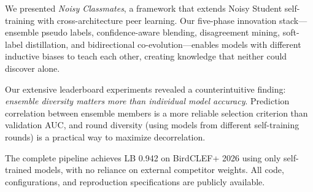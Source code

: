 \documentclass[a4paper]{article}
\begin{document}
We presented \emph{Noisy Classmates}, a framework that extends Noisy Student self-training with cross-architecture peer learning.
Our five-phase innovation stack---ensemble pseudo labels, confidence-aware blending, disagreement mining, soft-label distillation, and bidirectional co-evolution---enables models with different inductive biases to teach each other, creating knowledge that neither could discover alone.

Our extensive leaderboard experiments revealed a counterintuitive finding: \emph{ensemble diversity matters more than individual model accuracy}.
Prediction correlation between ensemble members is a more reliable selection criterion than validation AUC, and round diversity (using models from different self-training rounds) is a practical way to maximize decorrelation.

The complete pipeline achieves LB 0.942 on BirdCLEF+ 2026 using only self-trained models, with no reliance on external competitor weights.
All code, configurations, and reproduction specifications are publicly available.
\end{document}
